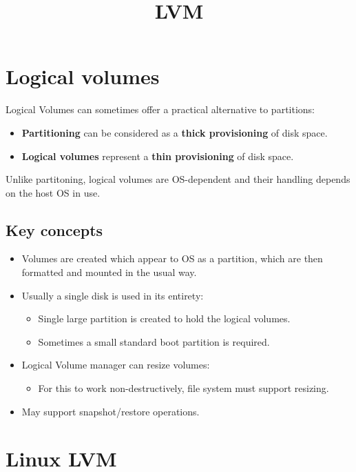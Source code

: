 \documentclass[slides]{pgnotes}
\title{LVM}
\begin{document}
\maketitle

\section{Logical volumes}
\label{sec:logical-volumes}

Logical Volumes can sometimes offer a practical alternative to
partitions:
\begin{itemize}
\item \textbf{Partitioning} can be considered as a \textbf{thick provisioning} of disk space.
\item \textbf{Logical volumes} represent a \textbf{thin provisioning} of disk space.
\end{itemize}
  
Unlike partitoning, logical volumes are OS-dependent and their handling
depends on the host OS in use.

\subsection{Key concepts}

\begin{itemize}
\item
  Volumes are created which appear to OS as a partition, which are then formatted and mounted in the usual way.
\item
  Usually a single disk is used in its entirety:
  \begin{itemize}
  \item Single large partition is created to hold the logical volumes.
  \item Sometimes a small standard boot partition is required.
  \end{itemize}
\item
  Logical Volume manager can resize volumes:
  \begin{itemize}
  \item For this to work non-destructively, file system must support resizing.
  \end{itemize}
\item
  May support snapshot/restore operations.
\end{itemize}

\section{Linux LVM}
\label{sec:linux-lvm}
\end{document}

